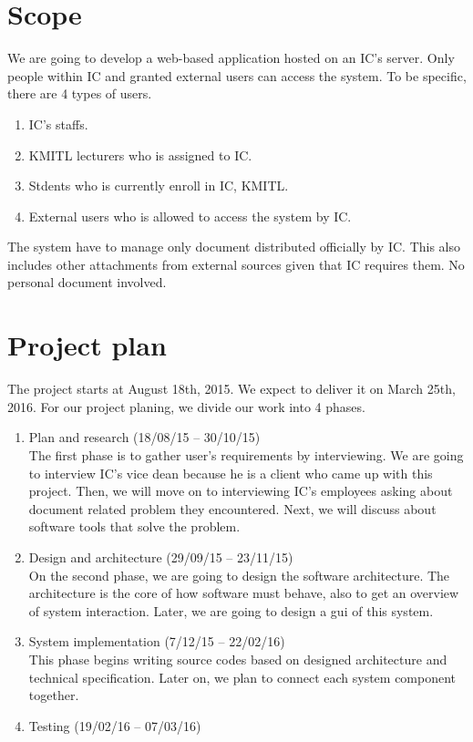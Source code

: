 \section{Scope}
We are going to develop a web-based application hosted on an IC's server.
Only people within IC and granted external users can access the system.
To be specific, there are 4 types of users.
\begin{enumerate}
\item IC's staffs.
\item KMITL lecturers who is assigned to IC.
\item Stdents who is currently enroll in IC, KMITL.
\item External users who is allowed to access the system by IC.
\end{enumerate}

The system have to manage only document distributed officially by IC.
This also includes other attachments from external sources given that IC requires them.
No personal document involved.

\section{Project plan}
The project starts at August 18th, 2015.
We expect to deliver it on March 25th, 2016.
For our project planing, we divide our work into 4 phases.
\begin{enumerate}
\item Plan and research (18/08/15 -- 30/10/15) \hfill \\
The first phase is to gather user's requirements by interviewing.
We are going to interview IC's vice dean because he is a client who came up with this project.
Then, we will move on to interviewing IC's employees asking about document related problem they encountered.
Next, we will discuss about software tools that solve the problem.
\item Design and architecture (29/09/15 -- 23/11/15) \hfill \\
On the second phase, we are going to design the software architecture.
The architecture is the core of how software must behave, also to get an overview of system interaction.
Later, we are going to design a \gls{gui} of this system.
\item System implementation (7/12/15 -- 22/02/16) \hfill \\
This phase begins writing source codes based on designed architecture and technical specification.
Later on, we plan to connect each system component together.
\item Testing (19/02/16 -- 07/03/16) \hfill \\

\end{enumerate}

